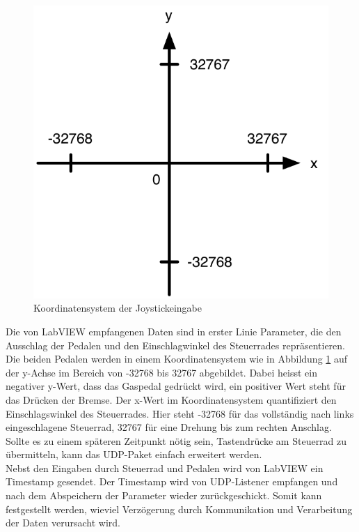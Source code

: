 \begin{figure}[H]
\centering 
\includegraphics[width=0.5\linewidth]{src/koordinatensystem.pdf}
\caption{Koordinatensystem der Joystickeingabe} %
\label{Koordinatensystem} %
\end{figure}

Die von LabVIEW empfangenen Daten sind in erster Linie Parameter, die den Ausschlag der Pedalen und den Einschlagwinkel des Steuerrades repräsentieren. Die beiden Pedalen werden in einem Koordinatensystem wie in Abbildung \ref{Koordinatensystem} auf der y-Achse im Bereich von -32768 bis 32767 abgebildet. Dabei heisst ein negativer y-Wert, dass das Gaspedal gedrückt wird, ein positiver Wert steht für das Drücken der Bremse. Der x-Wert im Koordinatensystem quantifiziert den Einschlagswinkel des Steuerrades. Hier steht -32768 für das vollständig nach links eingeschlagene Steuerrad, 32767 für eine Drehung bis zum rechten Anschlag. Sollte es zu einem späteren Zeitpunkt nötig sein, Tastendrücke am Steuerrad zu übermitteln, kann das UDP-Paket einfach erweitert werden.\\
Nebst den Eingaben durch Steuerrad und Pedalen wird von LabVIEW ein Timestamp gesendet. Der Timestamp wird von UDP-Listener empfangen und nach dem Abspeichern der Parameter wieder zurückgeschickt. Somit kann festgestellt werden, wieviel Verzögerung durch Kommunikation und Verarbeitung der Daten verursacht wird.\\

